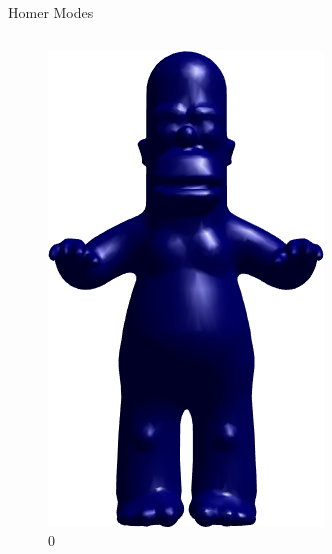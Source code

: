 \documentclass{beamer}
\begin{document}
\begin{frame}{Homer Modes}

\begin{columns}
\begin{column}[T]{3cm}
\begin{figure}[t]
    \includegraphics[width=\textwidth]{Harmonics/HomerModes/0.png}
    \caption*{\huge 0}
\end{figure}
\end{column}
\begin{column}[T]{3cm}
\begin{figure}[t]

\end{figure}
\end{column}
\end{columns}
\end{frame}
\end{document}
